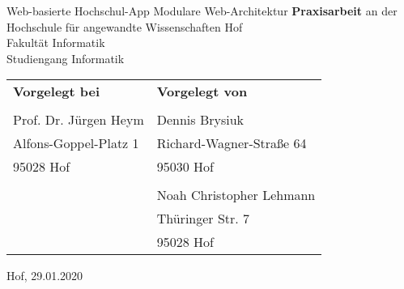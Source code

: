 \thispagestyle{empty}
\begin{titlepage}
\begin{center}
{\Large Web-basierte Hochschul-App}
\linebreak
{\large Modulare Web-Architektur}
\linebreak
\linebreak
{\large \textbf{Praxisarbeit}}
\linebreak
\linebreak
an der Hochschule für angewandte Wissenschaften Hof
\\
Fakultät Informatik
\\
Studiengang Informatik
\linebreak
\linebreak

\end{center}
\begin{tabular}{p{}l}
\textbf{Vorgelegt bei} 			&
\textbf{Vorgelegt von} 			\\
								&
								\\
Prof. Dr. Jürgen Heym 			&
Dennis Brysiuk 					\\
Alfons-Goppel-Platz 1 			&
Richard-Wagner-Straße 64 		\\
95028 Hof 						&
95030 Hof						\\
								&
								\\
								&
Noah Christopher Lehmann		\\
								&
Thüringer Str. 7				\\
								&
95028 Hof						
\end{tabular}
\linebreak
\linebreak
\begin{center}
Hof, 29.01.2020
\end{center}
\restoregeometry
\end{titlepage}